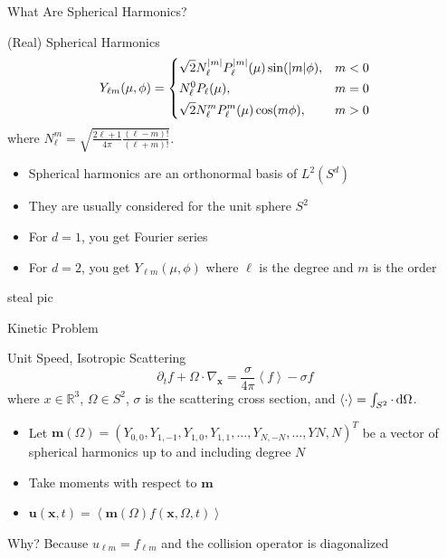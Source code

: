 \documentclass{beamer}
\renewcommand{\vec}[1]{\ensuremath{\mathbf{#1}}}
\newcommand{\integral}[1]{\ensuremath{\left\langle #1 \right\rangle}}
\newcommand{\R}{\ensuremath{\mathbb{R}}\xspace}
\begin{document}
    \begin{frame}{What Are Spherical Harmonics?}
        \begin{block}{(Real) Spherical Harmonics}
            \begin{equation*}
                Y_{\ell m}(\mu,\phi) =
                \begin{dcases}
                    \sqrt{2} N_\ell^{|m|} P_\ell^{|m|}(\mu) \sin(|m|\phi), & m < 0 \\
                    N_\ell^0 P_\ell(\mu), & m = 0 \\
                    \sqrt{2} N_\ell^m P_\ell^m(\mu) \cos(m\phi), & m > 0
                \end{dcases}
            \end{equation*}
            where $N_\ell^m = \sqrt{\frac{2\ell + 1}{4\pi}\frac{(\ell - m)!}{(\ell + m)!}}$.
            \begin{itemize}
                \item Spherical harmonics are an orthonormal basis of $L^2(S^d)$
                \item They are usually considered for the unit sphere $S^2$
                \item For $d = 1$, you get Fourier series
                \item For $d = 2$, you get $Y_{\ell m}(\mu,\phi)$ where $\ell$ is the degree and $m$ is the order
            \end{itemize}
        \end{block}
        \alert{steal pic}
    \end{frame}

    \begin{frame}{Kinetic Problem}
        \begin{block}{Unit Speed, Isotropic Scattering}
            \begin{equation*}
                \partial_t f + \Omega \cdot \nabla_\vec{x} = \frac{\sigma}{4\pi} \integral{f} - \sigma f
            \end{equation*}
            where $x \in \R^3$, $\Omega \in S^2$, $\sigma$ is the scattering cross section, and $\integral{\cdot} = \int_{S^2} \cdot \dif \Omega$.
        \end{block}

        \vfill

        \begin{itemize}
            \item Let $\vec{m}(\Omega) = \left(Y_{0,0}, Y_{1,-1}, Y_{1,0}, Y_{1,1}, \dots, Y_{N,-N}, \dots, Y{N,N}\right)^T$ be a vector of spherical harmonics up to and including degree $N$
            \item Take moments with respect to \vec{m}
            \item $\vec{u}(\vec{x}, t) = \integral{\vec{m}(\Omega) f(\vec{x}, \Omega, t)}$
        \end{itemize}
        \alert{Why? Because $u_{\ell m} = f_{\ell m}$ and the collision operator is diagonalized}
    \end{frame}
\end{document}
